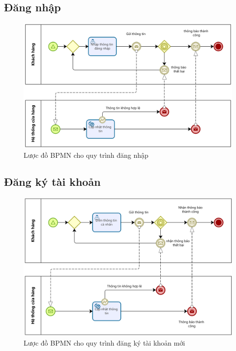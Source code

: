 \subsection{Đăng nhập}
\begin{figure}[!htp]
    \centering
    \includegraphics[width=14cm]{img/BPMN/Hien/Customer_login.png}
    \newline
    \caption{Lược đồ BPMN cho quy trình đăng nhập}
\end{figure}

\subsection{Đăng ký tài khoản}
\begin{figure}[!htp]
    \centering
    \includegraphics[width=14cm]{img/BPMN/Hien/Customer_register.png}
    \newline
    \caption{Lược đồ BPMN cho quy trình đăng ký tài khoản mới}
\end{figure}


